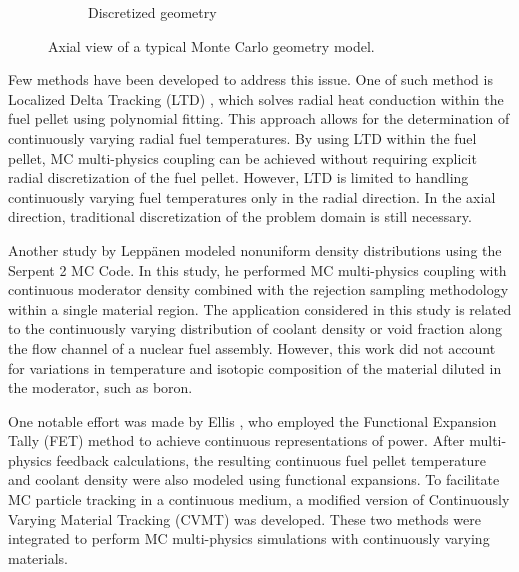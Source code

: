 \begin{figure}
\begin{subfigure}[b]{0.25\textwidth}
        \caption{Discretized geometry}
        \label{fig_1b}
    \end{subfigure}
    \caption{Axial view of a typical Monte Carlo geometry model.}
       \label{fig_1}
\end{figure}

Few methods have been developed to address this issue. One of such method is Localized Delta Tracking (LTD) \cite{nchoi_2020}, which solves radial heat conduction within the fuel pellet using polynomial fitting. This approach allows for the determination of continuously varying radial fuel temperatures. By using LTD within the fuel pellet, MC multi-physics coupling can be achieved without requiring explicit radial discretization of the fuel pellet. However, LTD is limited to handling continuously varying fuel temperatures only in the radial direction. In the axial direction, traditional discretization of the problem domain is still necessary.

Another study by Leppänen \cite{leppanen_2013} modeled nonuniform density distributions using the Serpent 2 MC Code. In this study, he performed MC multi-physics coupling with continuous moderator density combined with the rejection sampling methodology within a single material region. The application considered in this study is related to the continuously varying distribution of coolant density or void fraction along the flow channel of a nuclear fuel assembly. However, this work did not account for variations in temperature and isotopic composition of the material diluted in the moderator, such as boron.

One notable effort was made by Ellis \cite{ellis}, who employed the Functional Expansion Tally (FET) method \cite{chadsey,gries} to achieve continuous representations of power. After multi-physics feedback calculations, the resulting continuous fuel pellet temperature and coolant density were also modeled using functional expansions. To facilitate MC particle tracking in a continuous medium, a modified version of Continuously Varying Material Tracking (CVMT) \cite{brown} was developed. These two methods were integrated to perform MC multi-physics simulations with continuously varying materials.

